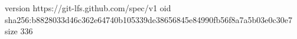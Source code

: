 version https://git-lfs.github.com/spec/v1
oid sha256:b8828033d46c362e64740b105339de38656845e84990fb56f8a7a5b03e0c30e7
size 336
